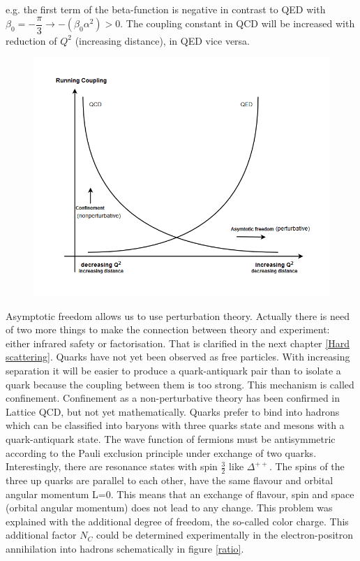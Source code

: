 e.g. the first term of the beta-function is negative in contrast to QED with $ \beta_0=- \dfrac{\pi}{3} \rightarrow -(\beta_0 \alpha^2) >0 $. The coupling constant in QCD will be increased
with reduction of $ Q^2 $ (increasing distance), in QED vice versa.
\begin{figure}[h!]
\centering
\includegraphics[scale=0.5]{images/Intro/QCDRunningCoupling.png}
\end{figure}



Asymptotic freedom allows us to use perturbation theory. Actually there is need of two more things to make the connection between theory and experiment: either infrared safety or factorisation. That is clarified in the next chapter \ref{Hard scattering}.
Quarks have not yet been observed as free particles. With increasing separation it will be easier to produce a quark-antiquark pair than to isolate a quark because the coupling between them is too strong. This mechanism is called confinement. Confinement as a non-perturbative theory has been confirmed in Lattice QCD, but not yet mathematically.
Quarks prefer to bind into hadrons which can be classified into baryons with three quarks state and mesons with a quark-antiquark state.
The wave function of fermions must be antisymmetric according to the Pauli exclusion principle under exchange of two quarks. Interestingly, there are resonance states with spin $ \frac{3}{2} $ like $ {\Delta}^{++} $.
The spins of the three up quarks are parallel to each other, have the same flavour and orbital angular momentum L=0. This means that an exchange of flavour, spin and space (orbital angular momentum) does not lead to any change. This problem was explained with the additional degree of freedom, the so-called color charge. This additional factor $N_C$ could be determined experimentally in the electron-positron annihilation into hadrons schematically in figure \ref{ratio}. 

